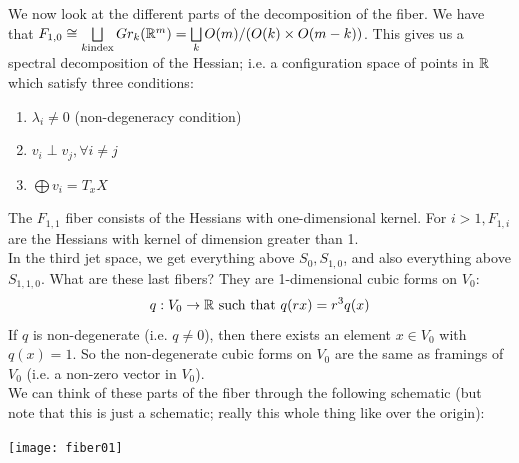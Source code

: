 \documentclass{article}
\newtheorem{proposed work}[theorem]{Proposed Work}
\begin{document}
We now look at the different parts of the decomposition of the fiber. We have that $F_{1,0}\cong \bigsqcup\limits_{k \text{index}} Gr_k(\mathbb R^m)=\bigsqcup\limits_{k}O(m)/(O(k)\times O(m-k))$. This gives us a spectral decomposition of the Hessian; i.e. a configuration space of points in $\mathbb R$ which satisfy three conditions:
\begin{enumerate}
\item $\lambda_i\neq 0$ (non-degeneracy condition)
\item $v_i\perp v_j, \forall i\neq j$
\item $\bigoplus v_i=T_xX$
\end{enumerate}
\begin{center}
\end{center}

The $F_{1,1}$ fiber consists of the Hessians with one-dimensional kernel. For $i>1, F_{1,i}$ are the Hessians with kernel of dimension greater than 1. \\

In the third jet space, we get everything above $S_0, S_{1,0}$, and also everything above $S_{1,1,0}$. What are these last fibers? They are 1-dimensional cubic forms on $V_0$: 
$$q:V_0\to \mathbb R \text{ such that } q(rx)=r^3q(x)$$
If $q$ is non-degenerate (i.e. $q\neq 0$), then there exists an element $x\in V_0$ with $q(x)=1$. So the non-degenerate cubic forms on $V_0$ are the same as framings of $V_0$ (i.e. a non-zero vector in $V_0$).\\

We can think of these parts of the fiber through the following schematic (but note that this is just a schematic; really this whole thing like over the origin):\\
\begin{center}
\texttt{[image: fiber01]}
\end{center}
\end{document}
